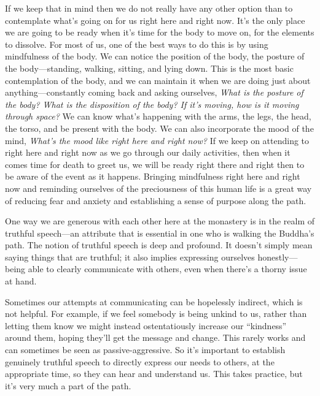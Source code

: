 If we keep that in mind then we do not really have any other option 
than to contemplate what's going on for us right here and right now. 
It's the only place we are going to be ready when it's time for the 
body to move on, for the elements to dissolve. For most of us, one of 
the best ways to do this is by using mindfulness of the body. We can 
notice the position of the body, the posture of the body---standing, 
walking, sitting, and lying down. This is the most basic contemplation 
of the body, and we can maintain it when we are doing just about 
anything---constantly coming back and asking ourselves, \emph{What is 
the posture of the body? What is the disposition of the body? If it's 
moving, how is it moving through space?} We can know what's happening 
with the arms, the legs, the head, the torso, and be present with the 
body. We can also incorporate the mood of the mind, \emph{What's the 
mood like right here and right now?} If we keep on attending to right 
here and right now as we go through our daily activities, then when it 
comes time for death to greet us, we will be ready right there and 
right then to be aware of the event as it happens. Bringing mindfulness 
right here and right now and reminding ourselves of the preciousness of 
this human life is a great way of reducing fear and anxiety and 
establishing a sense of purpose along the path.


One way we are generous with each other here at the monastery is in the 
realm of truthful speech---an attribute that is essential in one who is 
walking the Buddha's path. The notion of truthful speech is deep and 
profound. It doesn't simply mean saying things that are truthful; it 
also implies expressing ourselves honestly---being able to clearly 
communicate with others, even when there's a thorny issue at hand.

Sometimes our attempts at communicating can be hopelessly indirect, 
which is not helpful. For example, if we feel somebody is being unkind 
to us, rather than letting them know we might instead ostentatiously 
increase our ``kindness'' around them, hoping they'll get the message 
and change. This rarely works and can sometimes be seen as 
passive-aggressive. So it's important to establish genuinely truthful 
speech to directly express our needs to others, at the appropriate 
time, so they can hear and understand us. This takes practice, but it's 
very much a part of the path.

